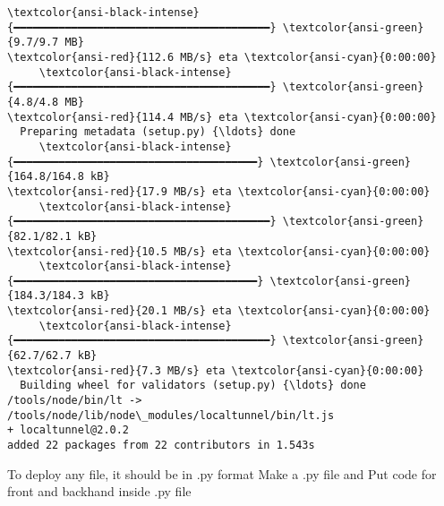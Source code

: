 \documentclass[11pt]{article}
\begin{document}
    \begin{Verbatim}[commandchars=\\\{\}]
     \textcolor{ansi-black-intense}{━━━━━━━━━━━━━━━━━━━━━━━━━━━━━━━━━━━━━━━━} \textcolor{ansi-green}{9.7/9.7 MB}
\textcolor{ansi-red}{112.6 MB/s} eta \textcolor{ansi-cyan}{0:00:00}
     \textcolor{ansi-black-intense}{━━━━━━━━━━━━━━━━━━━━━━━━━━━━━━━━━━━━━━━━} \textcolor{ansi-green}{4.8/4.8 MB}
\textcolor{ansi-red}{114.4 MB/s} eta \textcolor{ansi-cyan}{0:00:00}
  Preparing metadata (setup.py) {\ldots} done
     \textcolor{ansi-black-intense}{━━━━━━━━━━━━━━━━━━━━━━━━━━━━━━━━━━━━━━} \textcolor{ansi-green}{164.8/164.8 kB}
\textcolor{ansi-red}{17.9 MB/s} eta \textcolor{ansi-cyan}{0:00:00}
     \textcolor{ansi-black-intense}{━━━━━━━━━━━━━━━━━━━━━━━━━━━━━━━━━━━━━━━━} \textcolor{ansi-green}{82.1/82.1 kB}
\textcolor{ansi-red}{10.5 MB/s} eta \textcolor{ansi-cyan}{0:00:00}
     \textcolor{ansi-black-intense}{━━━━━━━━━━━━━━━━━━━━━━━━━━━━━━━━━━━━━━} \textcolor{ansi-green}{184.3/184.3 kB}
\textcolor{ansi-red}{20.1 MB/s} eta \textcolor{ansi-cyan}{0:00:00}
     \textcolor{ansi-black-intense}{━━━━━━━━━━━━━━━━━━━━━━━━━━━━━━━━━━━━━━━━} \textcolor{ansi-green}{62.7/62.7 kB}
\textcolor{ansi-red}{7.3 MB/s} eta \textcolor{ansi-cyan}{0:00:00}
  Building wheel for validators (setup.py) {\ldots} done
/tools/node/bin/lt ->
/tools/node/lib/node\_modules/localtunnel/bin/lt.js
+ localtunnel@2.0.2
added 22 packages from 22 contributors in 1.543s
    \end{Verbatim}
To deploy any file, it should be in .py format
Make a .py file and Put code for front and backhand inside .py file
\end{document}
